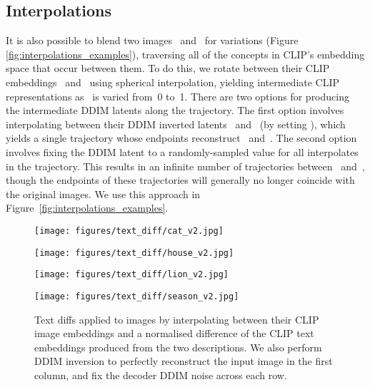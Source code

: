 \documentclass{article}
\begin{document}
\subsection{Interpolations}
\label{sec:interpolations}
It is also possible to blend two images~ and~ for variations (Figure \ref{fig:interpolations_examples}), traversing all of the concepts in CLIP's embedding space that occur between them. To do this, we rotate between their CLIP embeddings~ and~ using spherical interpolation, yielding intermediate CLIP representations  as~ is varied from~0 to~1. There are two options for producing the intermediate DDIM latents along the trajectory. The first option involves interpolating between their DDIM inverted latents~ and~ (by setting ), which yields a single trajectory whose endpoints reconstruct~ and~. The second option involves fixing the DDIM latent to a randomly-sampled value for all interpolates in the trajectory. This results in an infinite number of trajectories between~ and~, though the endpoints of these trajectories will generally no longer coincide with the original images. We use this approach in Figure~\ref{fig:interpolations_examples}.

\begin{figure*}[t]
    \centering
    \texttt{[image: figures/text\_diff/cat\_v2.jpg]}
    \vspace{0.05in}
    \scriptsize {}

    \texttt{[image: figures/text\_diff/house\_v2.jpg]}
    \vspace{0.05in}
    \scriptsize {}

    \texttt{[image: figures/text\_diff/lion\_v2.jpg]}
    \vspace{0.05in}
    \scriptsize {}
    
    \texttt{[image: figures/text\_diff/season\_v2.jpg]}
    \vspace{0.05in}
    \scriptsize {}
    
    \caption{Text diffs applied to images by interpolating between their CLIP image embeddings and a normalised difference of the CLIP text embeddings produced from the two descriptions. We also perform DDIM inversion to perfectly reconstruct the input image in the first column, and fix the decoder DDIM noise across each row. }
    \label{fig:text_diffs}
    \vskip -0.2in 
\end{figure*}
\end{document}
